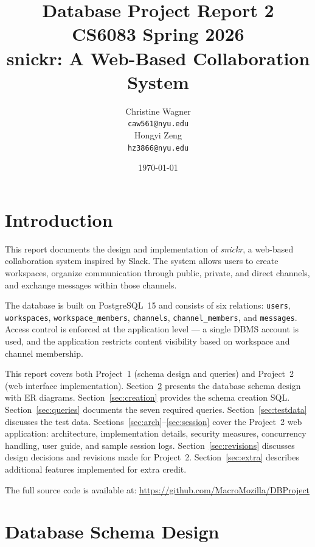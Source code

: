\documentclass[11pt]{article}
\title{Database Project Report 2 \\ \large CS6083 Spring 2026 \\ \large snickr: A Web-Based Collaboration System}
\author{
    \begin{tabular}[t]{c}
        Christine Wagner \\
        \texttt{caw561@nyu.edu}
    \end{tabular}
    \hspace{2em}
    \begin{tabular}[t]{c}
        Hongyi Zeng \\
        \texttt{hz3866@nyu.edu}
    \end{tabular}
}
\date{\today}
\begin{document}
\maketitle

\tableofcontents
\newpage


\section{Introduction}

This report documents the design and implementation of \textit{snickr}, a web-based collaboration system inspired by Slack. The system allows users to create workspaces, organize communication through public, private, and direct channels, and exchange messages within those channels.

The database is built on PostgreSQL~15 and consists of six relations: \texttt{users}, \texttt{workspaces}, \texttt{workspace\_members}, \texttt{channels}, \texttt{channel\_members}, and \texttt{messages}. Access control is enforced at the application level --- a single DBMS account is used, and the application restricts content visibility based on workspace and channel membership.

This report covers both Project~1 (schema design and queries) and Project~2 (web interface implementation). Section~\ref{sec:schema} presents the database schema design with ER diagrams. Section~\ref{sec:creation} provides the schema creation SQL. Section~\ref{sec:queries} documents the seven required queries. Section~\ref{sec:testdata} discusses the test data. Sections~\ref{sec:arch}--\ref{sec:session} cover the Project~2 web application: architecture, implementation details, security measures, concurrency handling, user guide, and sample session logs. Section~\ref{sec:revisions} discusses design decisions and revisions made for Project~2. Section~\ref{sec:extra} describes additional features implemented for extra credit.

The full source code is available at: \url{https://github.com/MacroMozilla/DBProject}


\section{Database Schema Design}
\label{sec:schema}
\end{document}
